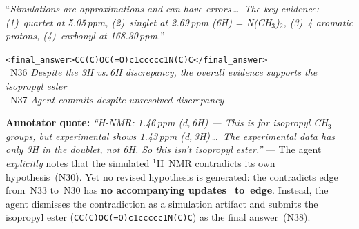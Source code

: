 \begin{tcolorbox}
\begin{description}[font=\sffamily\bfseries\small, leftmargin=12pt, style=sameline, itemsep=6pt]
\item[Msg\,20 \normalfont\textsf{(Agent --- final answer)}]
\enquote{\emph{Simulations are approximations and can have errors\,\ldots\
The key evidence: (1)~quartet at 5.05\,ppm, (2)~singlet at 2.69\,ppm
(6H) = N(CH$_3$)$_2$, (3)~4 aromatic protons, (4)~carbonyl at
168.30\,ppm.}}
\par\texttt{<final\_answer>CC(C)OC(=O)c1ccc\-cc1N(C)C</final\_answer>}\\[2pt]
\nodebadge{J}~N36 \emph{Despite the 3H vs.\,6H discrepancy, the overall
evidence supports the isopropyl ester}\\
~N37 \emph{Agent commits despite unresolved discrepancy}

\end{description}

\medskip
\begin{center}
\end{center}

\smallskip\noindent
\textbf{Annotator quote:}
\emph{\enquote{H-NMR: 1.46\,ppm (d,\,6H) — This is for isopropyl CH$_3$ groups,
but experimental shows 1.43\,ppm (d,\,3H)\,\ldots\ The experimental data
has only 3H in the doublet, not 6H.  So this isn't isopropyl ester.}}
— The agent \emph{explicitly} notes that the simulated $^{1}$H~NMR
contradicts its own hypothesis~(N30).  Yet no revised hypothesis is generated:
the \textsf{contradicts} edge from~N33 to~N30 has \textbf{no accompanying
\textsf{updates\_to}~edge}.  Instead, the agent dismisses the contradiction
as a simulation artifact and submits the isopropyl ester
(\texttt{CC(C)OC(=O)c1ccccc1N(C)C}) as the final answer~(N38).
\end{tcolorbox}
